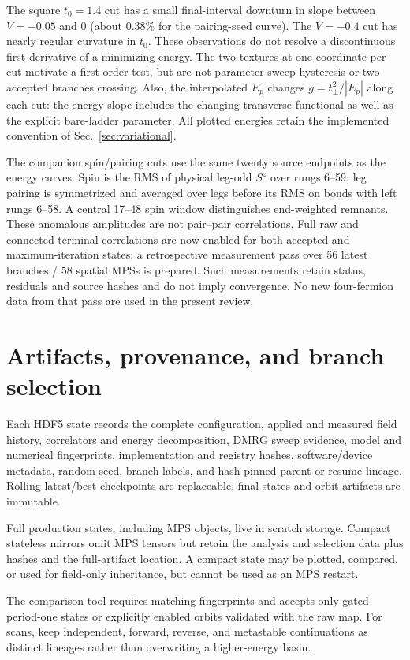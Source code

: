 \documentclass[11pt]{article}
\begin{document}
The square $t_0=1.4$ cut has a small final-interval downturn in slope
between $V=-0.05$ and 0 (about 0.38\% for the pairing-seed curve).
The $V=-0.4$ cut has nearly regular curvature in $t_0$. These observations
do not resolve a discontinuous first derivative of a minimizing energy.
The two textures at one coordinate per cut motivate a first-order test,
but are not parameter-sweep hysteresis or two accepted branches crossing.
Also, the interpolated $E_p$ changes $g=t_\perp^2/|E_p|$ along each cut:
the energy slope includes the changing transverse functional as well as
the explicit bare-ladder parameter. All plotted energies retain the
implemented convention of Sec.~\ref{sec:variational}.

The companion spin/pairing cuts use the same twenty source endpoints as
the energy curves. Spin is the RMS of physical leg-odd $S^z$ over rungs
6--59; leg pairing is symmetrized and averaged over legs before its RMS
on bonds with left rungs 6--58. A central 17--48 spin window distinguishes
end-weighted remnants. These anomalous amplitudes are not pair--pair
correlations. Full raw and connected terminal correlations are now enabled
for both accepted and maximum-iteration states; a retrospective measurement
pass over 56 latest branches / 58 spatial MPSs is prepared. Such measurements
retain status, residuals and source hashes and do not imply convergence.
No new four-fermion data from that pass are used in the present review.

\section{Artifacts, provenance, and branch selection}

Each HDF5 state records the complete configuration, applied and measured field
history, correlators and energy decomposition, DMRG sweep evidence, model and
numerical fingerprints, implementation and registry hashes, software/device
metadata, random seed, branch labels, and hash-pinned parent or resume lineage.
Rolling latest/best checkpoints are replaceable; final states and orbit
artifacts are immutable.

Full production states, including MPS objects, live in scratch storage.
Compact stateless mirrors omit MPS tensors but retain the analysis and
selection data plus hashes and the full-artifact location.  A compact state may
be plotted, compared, or used for field-only inheritance, but cannot be used as
an MPS restart.

The comparison tool requires matching fingerprints and accepts only gated
period-one states or explicitly enabled orbits validated with the raw map.
For scans, keep
independent, forward, reverse, and metastable continuations as distinct
lineages rather than overwriting a higher-energy basin.
\end{document}

